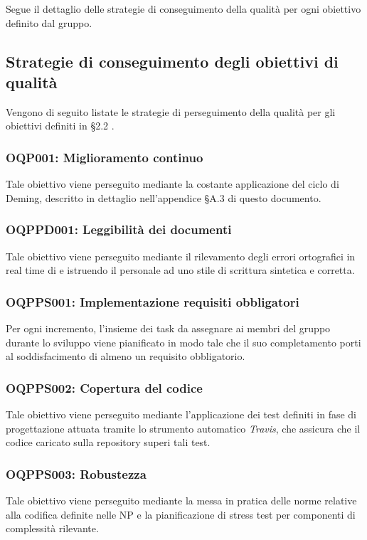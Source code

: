 \documentclass[openany,12pt,a4paper]{report}
\begin{document}
	Segue il dettaglio delle strategie di conseguimento della qualità per ogni obiettivo definito dal gruppo.

	\subsection{Strategie di conseguimento degli obiettivi di \\ qualità}
	
	Vengono di seguito listate le strategie di perseguimento della qualità per gli obiettivi definiti in §2.2 .
	
	\subsubsection{OQP001: Miglioramento continuo}
	Tale obiettivo viene perseguito mediante la costante applicazione del ciclo di Deming, descritto in dettaglio nell'appendice §A.3 di questo documento.
	
	\subsubsection{OQPPD001: Leggibilità dei documenti}
	Tale obiettivo viene perseguito mediante il rilevamento degli errori ortografici in real time di  e istruendo il personale ad uno stile di scrittura sintetica e corretta.
	
	\subsubsection{OQPPS001: Implementazione requisiti obbligatori}
	Per ogni incremento, l'insieme dei task da assegnare ai membri del gruppo durante lo sviluppo viene pianificato in modo tale che il suo completamento porti al soddisfacimento di almeno un requisito obbligatorio.   
	
	\subsubsection{OQPPS002: Copertura del codice}
	Tale obiettivo viene perseguito mediante l'applicazione dei test definiti in fase di progettazione attuata tramite lo strumento automatico \textit{Travis}, che assicura che il codice caricato sulla repository superi tali test.
	
	\subsubsection{OQPPS003: Robustezza}
	Tale obiettivo viene perseguito mediante la messa in pratica delle norme relative alla codifica definite nelle NP e la pianificazione di stress test per componenti di complessità rilevante.
	
\end{document}

